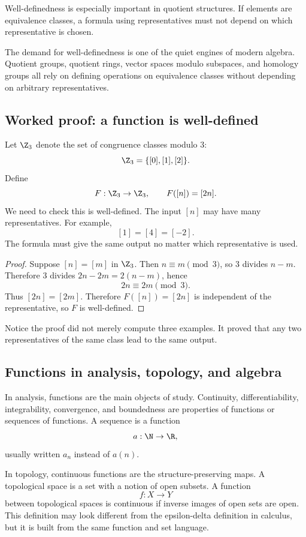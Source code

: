 Well-definedness is especially important in quotient structures. If elements are equivalence classes, a formula using representatives must not depend on which representative is chosen.

\begin{historybox}
The demand for well-definedness is one of the quiet engines of modern algebra. Quotient groups, quotient rings, vector spaces modulo subspaces, and homology groups all rely on defining operations on equivalence classes without depending on arbitrary representatives.
\end{historybox}

\subsection{Worked proof: a function is well-defined}

Let $\Z_3$ denote the set of congruence classes modulo $3$:
\[
\Z_3=\{[0],[1],[2]\}.
\]
Define
\[
F:\Z_3\to\Z_3,\qquad F([n])=[2n].
\]
We need to check this is well-defined. The input $[n]$ may have many representatives. For example,
\[
[1]=[4]=[-2].
\]
The formula must give the same output no matter which representative is used.

\begin{proof}
Suppose $[n]=[m]$ in $\Z_3$. Then $n\equiv m\pmod 3$, so $3$ divides $n-m$. Therefore $3$ divides $2n-2m=2(n-m)$, hence
\[
2n\equiv 2m\pmod 3.
\]
Thus $[2n]=[2m]$. Therefore $F([n])=[2n]$ is independent of the representative, so $F$ is well-defined.
\end{proof}

Notice the proof did not merely compute three examples. It proved that any two representatives of the same class lead to the same output.

\subsection{Functions in analysis, topology, and algebra}

In analysis, functions are the main objects of study. Continuity, differentiability, integrability, convergence, and boundedness are properties of functions or sequences of functions. A sequence is a function
\[
a:\N\to\R,
\]
usually written $a_n$ instead of $a(n)$.

In topology, continuous functions are the structure-preserving maps. A topological space is a set with a notion of open subsets. A function
\[
f:X\to Y
\]
between topological spaces is continuous if inverse images of open sets are open. This definition may look different from the epsilon-delta definition in calculus, but it is built from the same function and set language.


